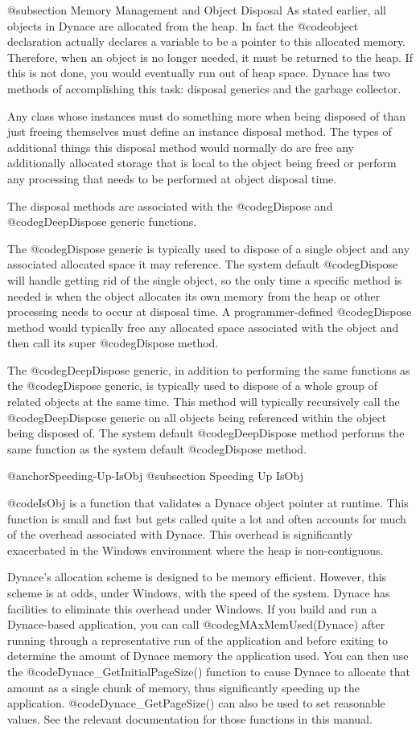 @subsection Memory Management and Object Disposal
As stated earlier, all objects in Dynace are allocated from the heap.  In
fact the @code{object} declaration actually declares a variable to be a
pointer to this allocated memory.  Therefore, when an object is no
longer needed, it must be returned to the heap.  If this is not done, you
would eventually run out of heap space.  Dynace has two methods of
accomplishing this task: disposal generics and the garbage collector.

Any class whose instances must do something more when
being disposed of than just freeing themselves must define an instance
disposal method.  The types of additional things this disposal method
would normally do are free any additionally allocated storage that is
local to the object being freed or perform any processing that needs
to be performed at object disposal time.

The disposal methods are associated with the @code{gDispose}
and @code{gDeepDispose} generic functions.

The @code{gDispose} generic is typically used to dispose of a single
object and any associated allocated space it may reference.  The system
default @code{gDispose} will handle getting rid of the single object, so
the only time a specific method is needed is when the object
allocates its own memory from the heap or other processing needs to
occur at disposal time.  A programmer-defined @code{gDispose} method
would typically free any allocated space associated with the object and
then call its super @code{gDispose} method.

The @code{gDeepDispose} generic, in addition to performing the same
functions as the @code{gDispose} generic, is typically used to dispose
of a whole group of related objects at the same time.  This method will
typically recursively call the @code{gDeepDispose} generic on all
objects being referenced within the object being disposed of.  The system
default @code{gDeepDispose} method performs the same function as the
system default @code{gDispose} method.

@anchor{Speeding-Up-IsObj}
@subsection Speeding Up IsObj

@code{IsObj} is a function that validates a Dynace object pointer at
runtime.  This function is small and fast but gets called
quite a lot and often accounts for much of the overhead associated
with Dynace.  This overhead is significantly exacerbated in the
Windows environment where the heap is non-contiguous.

Dynace's allocation scheme is designed to be memory efficient.
However, this scheme is at odds, under Windows, with the speed of the
system. Dynace has facilities to eliminate this overhead under
Windows.  If you build and run a Dynace-based application, you can
call @code{gMAxMemUsed(Dynace)} after running through a representative
run of the application and before exiting to determine the amount of
Dynace memory the application used.  You can then use the
@code{Dynace_GetInitialPageSize()} function to cause Dynace to
allocate that amount as a single chunk of memory, thus significantly
speeding up the application.  @code{Dynace_GetPageSize()} can also
be used to set reasonable values.  See the relevant documentation
for those functions in this manual.


